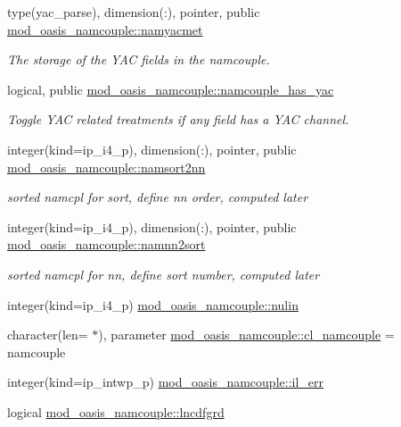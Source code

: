 \begin{DoxyCompactItemize}
type(yac\+\_\+parse), dimension(\+:), pointer, public \hyperlink{namespacemod__oasis__namcouple_a5a6235eee48f0afaa42eedbf807a252e}{mod\+\_\+oasis\+\_\+namcouple\+::namyacmet}
\begin{DoxyCompactList}\small\item\em The storage of the Y\+AC fields in the namcouple. \end{DoxyCompactList}\item 
logical, public \hyperlink{namespacemod__oasis__namcouple_a08ce642a6a26fb318ae50f8c1a6e3f9a}{mod\+\_\+oasis\+\_\+namcouple\+::namcouple\+\_\+has\+\_\+yac}
\begin{DoxyCompactList}\small\item\em Toggle Y\+AC related treatments if any field has a Y\+AC channel. \end{DoxyCompactList}\item 
integer(kind=ip\+\_\+i4\+\_\+p), dimension(\+:), pointer, public \hyperlink{namespacemod__oasis__namcouple_a4555b14f38928b7f0fb7f77b9c42d0a0}{mod\+\_\+oasis\+\_\+namcouple\+::namsort2nn}
\begin{DoxyCompactList}\small\item\em sorted namcpl for sort, define nn order, computed later \end{DoxyCompactList}\item 
integer(kind=ip\+\_\+i4\+\_\+p), dimension(\+:), pointer, public \hyperlink{namespacemod__oasis__namcouple_a0ace7c451d8658759b9c8d871926a76e}{mod\+\_\+oasis\+\_\+namcouple\+::namnn2sort}
\begin{DoxyCompactList}\small\item\em sorted namcpl for nn, define sort number, computed later \end{DoxyCompactList}\item 
integer(kind=ip\+\_\+i4\+\_\+p) \hyperlink{namespacemod__oasis__namcouple_a36ef9483c332254e38c52b1d78d26f1f}{mod\+\_\+oasis\+\_\+namcouple\+::nulin}
\item 
character(len= $\ast$), parameter \hyperlink{namespacemod__oasis__namcouple_ae023a43e29bb32ebf11f193e34d8bd85}{mod\+\_\+oasis\+\_\+namcouple\+::cl\+\_\+namcouple} = \textquotesingle{}namcouple\textquotesingle{}
\item 
integer(kind=ip\+\_\+intwp\+\_\+p) \hyperlink{namespacemod__oasis__namcouple_a18b7a14f095f3cb6ace40afc06e2a5b9}{mod\+\_\+oasis\+\_\+namcouple\+::il\+\_\+err}
\item 
logical \hyperlink{namespacemod__oasis__namcouple_a5d6add8b958acc8b865b898d9e54ac73}{mod\+\_\+oasis\+\_\+namcouple\+::lncdfgrd}

\end{DoxyCompactItemize}
